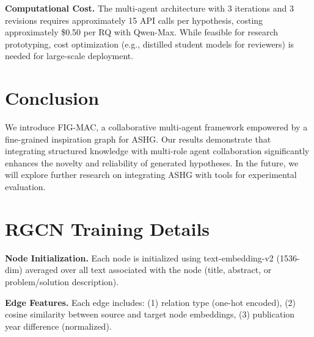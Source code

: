 \documentclass[runningheads]{llncs}
\begin{document}
\textbf{Computational Cost.} The multi-agent architecture with 3 iterations and 3 revisions requires approximately 15 API calls per hypothesis, costing approximately \$0.50 per RQ with Qwen-Max. While feasible for research prototyping, cost optimization (e.g., distilled student models for reviewers) is needed for large-scale deployment.


\section{Conclusion}
\label{sec:conclusion}

We introduce FIG-MAC, a collaborative multi-agent framework empowered by a fine-grained inspiration graph for ASHG. Our results demonstrate that integrating structured knowledge with multi-role agent collaboration significantly enhances the novelty and reliability of generated hypotheses. In the future, we will explore further research on integrating ASHG with tools for experimental evaluation.








\newpage
\appendix

\section{RGCN Training Details}
\label{app:rgcn}

\textbf{Node Initialization.} Each node is initialized using text-embedding-v2 (1536-dim) averaged over all text associated with the node (title, abstract, or problem/solution description).

\textbf{Edge Features.} Each edge includes: (1) relation type (one-hot encoded), (2) cosine similarity between source and target node embeddings, (3) publication year difference (normalized).
\end{document}
